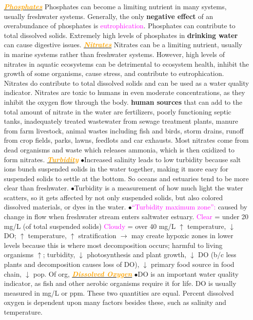\documentclass{article}
\newcommand{\ddd}{$\bullet$}
\newcommand{\pink}[1]{\textcolor{magenta}{#1}}
\newcommand{\orange}[1]{\textcolor{orange}{#1}}
\newcommand{\mysubsection}[1]{\underline{\textbf{{\textit{\orange{#1}}}}}}
\newcommand{\vocab}[1]{{\pink{#1}}}
\begin{document}
\begin{multicols*}{4}
        \mysubsection{Phosphates}
            Phosphates can become a limiting nutrient in many systems, usually freshwater systems. Generally, the only \textbf{negative effect} of an overabundance of phosphates is \pink{eutrophication}. Phosphates can contribute to total dissolved solids. Extremely high levels of phosphates in \textbf{drinking water} can cause digestive issues. 
        \mysubsection{Nitrates}
           Nitrates can be a limiting nutrient, usually in marine systems rather than freshwater systems. However, high levels of nitrates in aquatic ecosystems can be detrimental to ecosystem health, inhibit the growth of some organisms, cause stress, and contribute to eutrophication. Nitrates do contribute to total dissolved solids and can be used as a water quality indicator. Nitrates are toxic to humans in even moderate concentrations, as they inhibit the oxygen flow through the body. \textbf{human sources} that can add to the total amount of nitrate in the water are fertilizers, poorly functioning septic tanks, inadequately treated wastewater from sewage treatment plants, manure from farm livestock, animal wastes including fish and birds, storm drains, runoff from crop fields, parks, lawns, feedlots and car exhausts. Most nitrates come from dead organisms and waste which releases ammonia, which is then oxidized to form nitrates.
        \mysubsection{Turbidity}
            \ddd Increased salinity leads to low turbidity because salt ions bunch suspended solids in the water together, making it more easy for suspended solids to settle at the bottom. So oceans and estuaries tend to be more clear than freshwater. 
            \ddd Turbidity is a measurement of how much light the water scatters, so it gets affected by not only suspended solids, but also colored dissolved materials, or dyes in the water.
            \ddd \vocab{“Turbidity maximum zone”: }caused by change in flow when freshwater stream enters saltwater estuary. \pink{Clear} = under 20 mg/L (of total suspended solids) \pink{Cloudy} = over 40 mg/L $ \uparrow $ temperature, $ \downarrow $ DO; $ \uparrow $ temperature, $ \uparrow $ stratification $ \rightarrow $ may create hypoxic zones in lower levels because this is where most decomposition occurs; harmful to living organisms $ \uparrow $; turbidity, $ \downarrow $ photosynthesis and plant growth,  $ \downarrow $ DO (b/c less plants and decomposition causes loss of DO), $ \downarrow $ primary food source in food chain, $ \downarrow $ pop. Of org,
        \mysubsection{Dissolved Oxygen}
            \ddd DO is an important water quality indicator, as fish and other aerobic organisms require it for life. DO is usually measured in mg/L or ppm. These two quantities are equal. Percent dissolved oxygen is dependent upon many factors besides these, such as salinity and temperature.

\end{multicols*}
\end{document}
